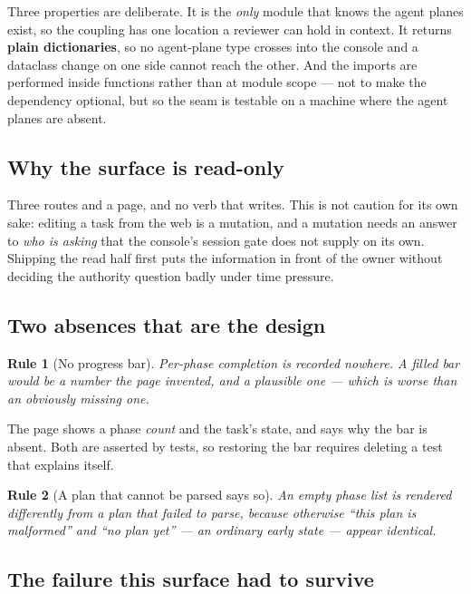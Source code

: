 \documentclass[11pt]{article}
\newtheorem{drule}{Rule}
\begin{document}
Three properties are deliberate. It is the \emph{only} module that knows the agent planes exist, so the coupling has one location a reviewer can hold in context. It returns \textbf{plain dictionaries}, so no agent-plane type crosses into the console and a dataclass change on one side cannot reach the other. And the imports are performed inside functions rather than at module scope --- not to make the dependency optional, but so the seam is testable on a machine where the agent planes are absent.

\subsection{Why the surface is read-only}

Three routes and a page, and no verb that writes. This is not caution for its own sake: editing a task from the web is a mutation, and a mutation needs an answer to \emph{who is asking} that the console's session gate does not supply on its own. Shipping the read half first puts the information in front of the owner without deciding the authority question badly under time pressure.

\subsection{Two absences that are the design}

\begin{drule}[No progress bar]
\label{rule:nobar}
Per-phase completion is recorded nowhere. A filled bar would be a number the page invented, and a plausible one --- which is worse than an obviously missing one.
\end{drule}

The page shows a phase \emph{count} and the task's state, and says why the bar is absent. Both are asserted by tests, so restoring the bar requires deleting a test that explains itself.

\begin{drule}[A plan that cannot be parsed says so]
\label{rule:unreadable}
An empty phase list is rendered differently from a plan that failed to parse, because otherwise \emph{``this plan is malformed''} and \emph{``no plan yet''} --- an ordinary early state --- appear identical.
\end{drule}

\subsection{The failure this surface had to survive}
\end{document}
